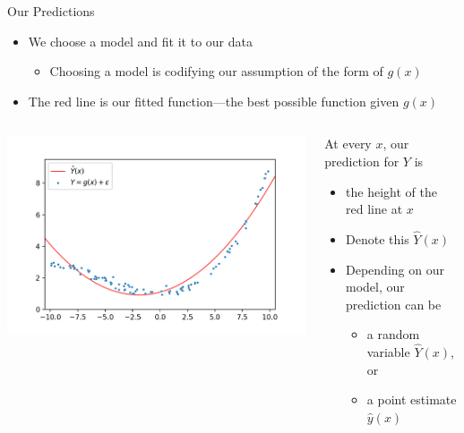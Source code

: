 \documentclass[aspectratio=169]{../latex_main/tntbeamer}  %
\begin{document}
	
	\begin{frame}{Our Predictions}
	    \begin{itemize}
	        \item We choose a model and fit it to our data
	        \begin{itemize}
	            \item Choosing a model is codifying our assumption of the form of $g(x)$
	        \end{itemize}
	        \item The red line is our fitted function—the best possible function given $g(x)$
	    \end{itemize}

	    \begin{columns}

	        \begin{column}{.4\textwidth}

	                    \includegraphics[scale=.5]{Bild3}
	        \end{column}
	        
	        
	         \begin{column}{.4\textwidth}
	         
	               At every $x$, our prediction for $Y$ is
	                \begin{itemize}
	                    \item the height of the red line at $x$
	                    \item Denote this  $\widehat{Y}(x)$
	                    \item Depending on our model, our prediction can be
	                    \begin{itemize}
	                        \item a random variable $\widehat{Y}(x)$, or
	                        \item a point estimate $\widehat{y}(x)$
	                    \end{itemize}
	                \end{itemize}
	                
	        \end{column}
	    \end{columns}
	\end{frame}
\end{document}
